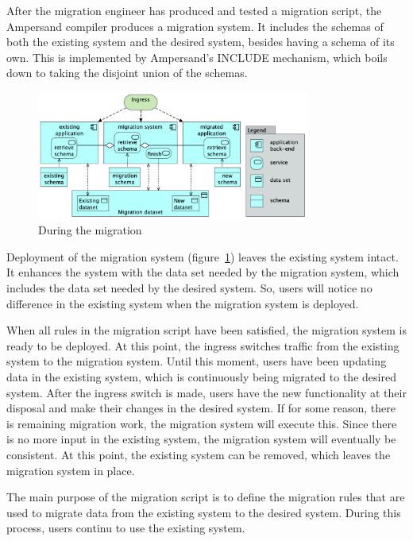 \documentclass{elsarticle}
\begin{document}
   After the migration engineer has produced and tested a migration script, the Ampersand compiler produces a migration system.
   It includes the schemas of both the existing system and the desired system, besides having a schema of its own.
   This is implemented by Ampersand's INCLUDE mechanism, which boils down to taking the disjoint union of the schemas.
\begin{figure}
   \centering
   \includegraphics[width=0.8\textwidth]{figures/During migration.png}
   \caption{During the migration}
   \label{fig:during}
\end{figure}
   Deployment of the migration system (figure~\ref{fig:during}) leaves the existing system intact.
   It enhances the system with the data set needed by the migration system, which includes the data set needed by the desired system.
   So, users will notice no difference in the existing system when the migration system is deployed.

   When all rules in the migration script have been satisfied, the migration system is ready to be deployed.
   At this point, the ingress switches traffic from the existing system to the migration system.
   Until this moment, users have been updating data in the existing system, which is continuously being migrated to the desired system.
   After the ingress switch is made, users have the new functionality at their disposal and make their changes in the desired system.
   If for some reason, there is remaining migration work, the migration system will execute this.
   Since there is no more input in the existing system, the migration system will eventually be consistent.
   At this point, the existing system can be removed, which leaves the migration system in place.


   The main purpose of the migration script is to define the migration rules that are used to migrate data from the existing system to the desired system.
   During this process, users continu to use the existing system.
\end{document}
